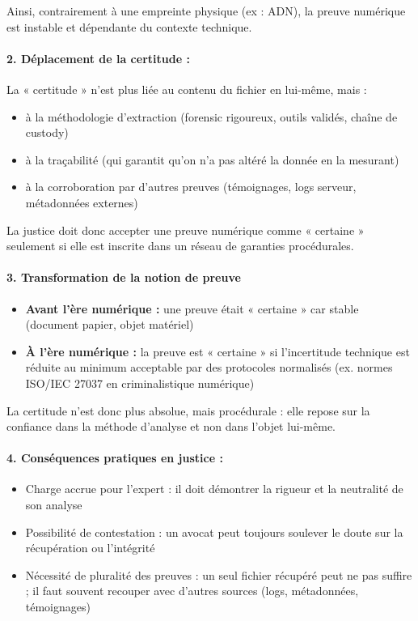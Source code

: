 \documentclass[12pt]{article}
\begin{document}
Ainsi, contrairement à une empreinte physique (ex : ADN), la preuve numérique est instable et dépendante du contexte technique.

\paragraph{2. Déplacement de la certitude :}
La « certitude » n'est plus liée au contenu du fichier en lui-même, mais :
\begin{itemize}
\item à la méthodologie d'extraction (forensic rigoureux, outils validés, chaîne de custody)
\item à la traçabilité (qui garantit qu'on n'a pas altéré la donnée en la mesurant)
\item à la corroboration par d'autres preuves (témoignages, logs serveur, métadonnées externes)
\end{itemize}

La justice doit donc accepter une preuve numérique comme « certaine » seulement si elle est inscrite dans un réseau de garanties procédurales.

\paragraph{3. Transformation de la notion de preuve}

\begin{itemize}
\item \textbf{Avant l'ère numérique :} une preuve était « certaine » car stable (document papier, objet matériel)
\item \textbf{À l'ère numérique :} la preuve est « certaine » si l'incertitude technique est réduite au minimum acceptable par des protocoles normalisés (ex. normes ISO/IEC 27037 en criminalistique numérique)
\end{itemize}

La certitude n'est donc plus absolue, mais procédurale : elle repose sur la confiance dans la méthode d'analyse et non dans l'objet lui-même.

\paragraph{4. Conséquences pratiques en justice :}
\begin{itemize}
\item Charge accrue pour l'expert : il doit démontrer la rigueur et la neutralité de son analyse
\item Possibilité de contestation : un avocat peut toujours soulever le doute sur la récupération ou l'intégrité
\item Nécessité de pluralité des preuves : un seul fichier récupéré peut ne pas suffire ; il faut souvent recouper avec d'autres sources (logs, métadonnées, témoignages)
\end{itemize}
\end{document}
